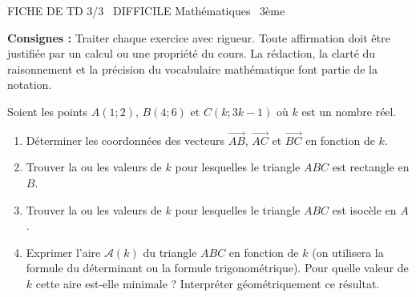 \documentclass[11pt]{article}
\begin{document}
\begin{tcolorbox}[enhanced,colback=popink,colframe=popink,arc=10pt,boxrule=0pt,left=12pt,right=12pt,top=9pt,bottom=9pt]
{\color{white}\popxbold\small FICHE DE TD 3/3 \textbullet\ DIFFICILE \hfill Mathématiques \textbullet\ 3ème\par}
\end{tcolorbox}
\vspace{4pt}
\noindent\textbf{Consignes :} Traiter chaque exercice avec rigueur. Toute affirmation doit être justifiée par un calcul ou une propriété du cours. La rédaction, la clarté du raisonnement et la précision du vocabulaire mathématique font partie de la notation.

\begin{exercice}
Soient les points $A(1;2)$, $B(4;6)$ et $C(k; 3k-1)$ où $k$ est un nombre réel.
\begin{enumerate}
    \item Déterminer les coordonnées des vecteurs $\overrightarrow{AB}$, $\overrightarrow{AC}$ et $\overrightarrow{BC}$ en fonction de $k$.
    \item Trouver la ou les valeurs de $k$ pour lesquelles le triangle $ABC$ est rectangle en $B$.
    \item Trouver la ou les valeurs de $k$ pour lesquelles le triangle $ABC$ est isocèle en $A$.
    \item Exprimer l'aire $\mathcal{A}(k)$ du triangle $ABC$ en fonction de $k$ (on utilisera la formule du déterminant ou la formule trigonométrique). Pour quelle valeur de $k$ cette aire est-elle minimale ? Interpréter géométriquement ce résultat.
\end{enumerate}
\end{exercice}
\end{document}
